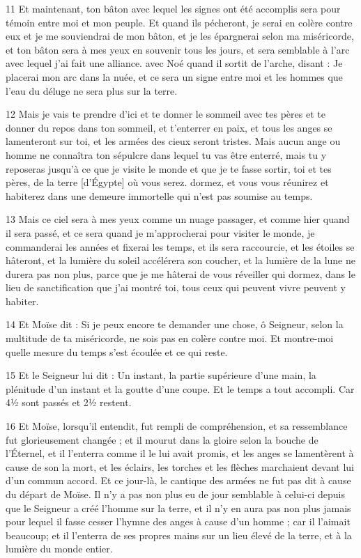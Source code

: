 \par 11 Et maintenant, ton bâton avec lequel les signes ont été accomplis sera pour témoin entre moi et mon peuple. Et quand ils pécheront, je serai en colère contre eux et je me souviendrai de mon bâton, et je les épargnerai selon ma miséricorde, et ton bâton sera à mes yeux en souvenir tous les jours, et sera semblable à l'arc avec lequel j'ai fait une alliance. avec Noé quand il sortit de l'arche, disant : Je placerai mon arc dans la nuée, et ce sera un signe entre moi et les hommes que l'eau du déluge ne sera plus sur la terre.

\par 12 Mais je vais te prendre d'ici et te donner le sommeil avec tes pères et te donner du repos dans ton sommeil, et t'enterrer en paix, et tous les anges se lamenteront sur toi, et les armées des cieux seront tristes. Mais aucun ange ou homme ne connaîtra ton sépulcre dans lequel tu vas être enterré, mais tu y reposeras jusqu'à ce que je visite le monde et que je te fasse sortir, toi et tes pères, de la terre [d'Égypte] où vous serez. dormez, et vous vous réunirez et habiterez dans une demeure immortelle qui n'est pas soumise au temps.

\par 13 Mais ce ciel sera à mes yeux comme un nuage passager, et comme hier quand il sera passé, et ce sera quand je m'approcherai pour visiter le monde, je commanderai les années et fixerai les temps, et ils sera raccourcie, et les étoiles se hâteront, et la lumière du soleil accélérera son coucher, et la lumière de la lune ne durera pas non plus, parce que je me hâterai de vous réveiller qui dormez, dans le lieu de sanctification que j'ai montré toi, tous ceux qui peuvent vivre peuvent y habiter.

\par 14 Et Moïse dit : Si je peux encore te demander une chose, ô Seigneur, selon la multitude de ta miséricorde, ne sois pas en colère contre moi. Et montre-moi quelle mesure du temps s'est écoulée et ce qui reste.

\par 15 Et le Seigneur lui dit : Un instant, la partie supérieure d'une main, la plénitude d'un instant et la goutte d'une coupe. Et le temps a tout accompli. Car 4½ sont passés et 2½ restent.

\par 16 Et Moïse, lorsqu'il entendit, fut rempli de compréhension, et sa ressemblance fut glorieusement changée ; et il mourut dans la gloire selon la bouche de l'Éternel, et il l'enterra comme il le lui avait promis, et les anges se lamentèrent à cause de son la mort, et les éclairs, les torches et les flèches marchaient devant lui d'un commun accord. Et ce jour-là, le cantique des armées ne fut pas dit à cause du départ de Moïse. Il n'y a pas non plus eu de jour semblable à celui-ci depuis que le Seigneur a créé l'homme sur la terre, et il n'y en aura pas non plus jamais pour lequel il fasse cesser l'hymne des anges à cause d'un homme ; car il l'aimait beaucoup; et il l'enterra de ses propres mains sur un lieu élevé de la terre, et à la lumière du monde entier.

